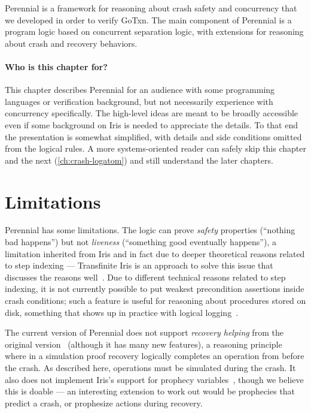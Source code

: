Perennial is a framework for reasoning about crash safety and concurrency that
we developed in order to verify GoTxn. The main component of Perennial is a
program logic based on concurrent separation logic, with extensions for
reasoning about crash and recovery behaviors.

\paragraph{Who is this chapter for?}
This chapter describes Perennial for an audience with some programming languages
or verification background, but not necessarily experience with concurrency
specifically. The high-level ideas are meant to be broadly accessible even if
some background on Iris is needed to appreciate the details. To that end the
presentation is somewhat simplified, with details and side conditions omitted
from the logical rules. A more systems-oriented reader can safely skip this
chapter and the next (\cref{ch:crash-logatom}) and still understand the later
chapters.




\section{Limitations}
\label{sec:perennial:limitations}

Perennial has some limitations. The logic can prove \emph{safety} properties
(``nothing bad happens'') but not \emph{liveness} (``something good eventually
happens''), a limitation inherited from Iris and in fact due to deeper
theoretical reasons related to step indexing --- Transfinite Iris is an approach
to solve this issue that discusses the reasons well~\cite{spies:transfinite}.
Due to different technical reasons related to step indexing, it is not currently
possible to put weakest precondition assertions inside crash conditions; such a
feature is useful for reasoning about procedures stored on disk, something that
shows up in practice with logical logging~\cite{mohan:aries}.

The current version of Perennial does not support \emph{recovery helping} from
the original version~\cite{chajed:perennial} (although it has many new
features), a reasoning principle where in a simulation proof recovery logically
completes an operation from before the crash. As described here, operations must
be simulated during the crash. It also does not implement Iris's support for
prophecy variables~\cite{jung:prophecy}, though we believe this is doable --- an
interesting extension to work out would be prophecies that predict a crash, or
prophesize actions during recovery.

